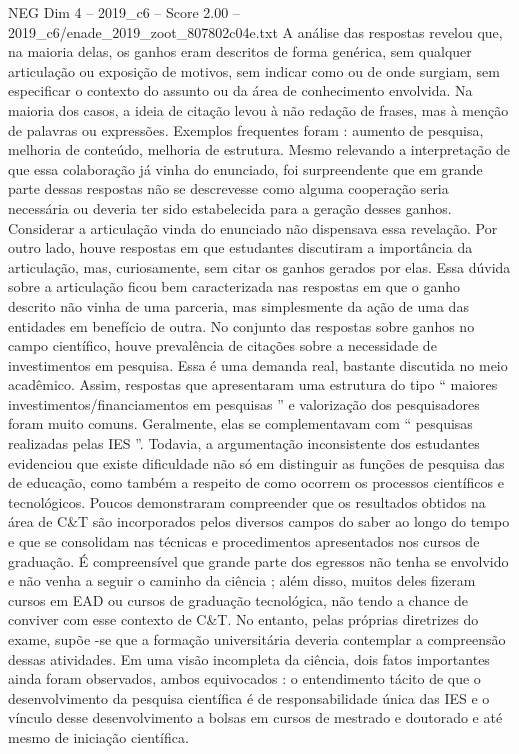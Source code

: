 \begin{textsample}{NEG Dim 4 – 2019\_c6 – Score 2.00 – 2019\_c6/enade\_2019\_zoot\_807802c04e.txt}
A análise das respostas revelou que, na maioria delas, os ganhos eram descritos de forma genérica, sem qualquer articulação ou exposição de motivos, sem indicar como ou de onde surgiam, sem especificar o contexto do assunto ou da área de conhecimento envolvida.
Na maioria dos casos, a ideia de citação levou à não redação de frases, mas à menção de palavras ou expressões.
Exemplos frequentes foram : aumento de pesquisa, melhoria de conteúdo, melhoria de estrutura.
Mesmo relevando a interpretação de que essa colaboração já vinha do enunciado, foi surpreendente que em grande parte dessas respostas não se descrevesse como alguma cooperação seria necessária ou deveria ter sido estabelecida para a geração desses ganhos.
Considerar a articulação vinda do enunciado não dispensava essa revelação.
Por outro lado, houve respostas em que estudantes discutiram a importância da articulação, mas, curiosamente, sem citar os ganhos gerados por elas.
Essa dúvida sobre a articulação ficou bem caracterizada nas respostas em que o ganho descrito não vinha de uma parceria, mas simplesmente da ação de uma das entidades em benefício de outra.
No conjunto das respostas sobre ganhos no campo científico, houve prevalência de citações sobre a necessidade de investimentos em pesquisa.
Essa é uma demanda real, bastante discutida no meio acadêmico.
Assim, respostas que apresentaram uma estrutura do tipo “ maiores investimentos/financiamentos em pesquisas ” e valorização dos pesquisadores foram muito comuns.
Geralmente, elas se complementavam com “ pesquisas realizadas pelas IES ”.
Todavia, a argumentação inconsistente dos estudantes evidenciou que existe dificuldade não só em distinguir as funções de pesquisa das de educação, como também a respeito de como ocorrem os processos científicos e tecnológicos.
Poucos demonstraram compreender que os resultados obtidos na área de C\&T são incorporados pelos diversos campos do saber ao longo do tempo e que se consolidam nas técnicas e procedimentos apresentados nos cursos de graduação.
É compreensível que grande parte dos egressos não tenha se envolvido e não venha a seguir o caminho da ciência ; além disso, muitos deles fizeram cursos em EAD ou cursos de graduação tecnológica, não tendo a chance de conviver com esse contexto de C\&T.
No entanto, pelas próprias diretrizes do exame, supõe -se que a formação universitária deveria contemplar a compreensão dessas atividades.
Em uma visão incompleta da ciência, dois fatos importantes ainda foram observados, ambos equivocados : o entendimento tácito de que o desenvolvimento da pesquisa científica é de responsabilidade única das IES e o vínculo desse desenvolvimento a bolsas em cursos de mestrado e doutorado e até mesmo de iniciação científica.

\end{textsample}
